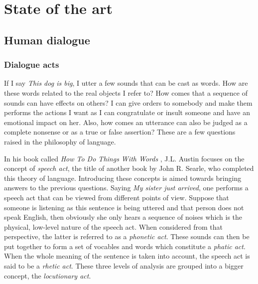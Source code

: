 \chapter{State of the art}

\label{ch:stateofart}

\section{Human dialogue}
	\subsection{Dialogue acts}
    \label{soa:dialogueacts}
    
    	If I say \textit{This dog is big}, I utter a few sounds that can be cast as words. How are these words related to the real objects I refer to? How comes that a sequence of sounds can have effects on others? I can give orders to somebody and make them performs the actions I want as I can congratulate or insult someone and have an emotional impact on her. Also, how comes an utterance can also be judged as a complete nonsense or as a true or false assertion? These are a few questions raised in the philosophy of language.
    
    	In his book called \textit{How To Do Things With Words} \cite{Austin1962}, J.L. Austin focuses on the concept of \textit{speech act}, the title of another book \cite{Searle1969} by John R. Searle, who completed this theory of language. Introducing these concepts is aimed towards bringing answers to the previous questions. Saying \textit{My sister just arrived}, one performs a speech act that can be viewed from different points of view. Suppose that someone is listening as this sentence is being uttered and that person does not speak English, then obviously she only hears a sequence of noises which is the physical, low-level nature of the speech act. When considered from that perspective, the latter is referred to as a \textit{phonetic act}. These sounds can then be put together to form a set of vocables and words which constitute a \textit{phatic act}. When the whole meaning of the sentence is taken into account, the speech act is said to be a \textit{rhetic act}. These three levels of analysis are grouped into a bigger concept, the \textit{locutionary act}.
			
